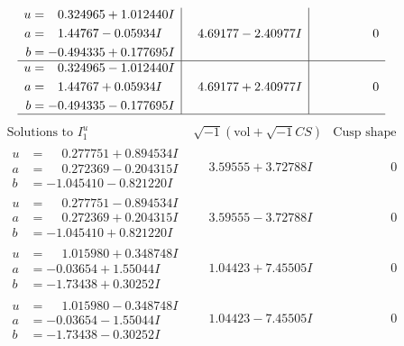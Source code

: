 \documentclass[1p]{elsarticle_modified}
\theoremstyle{definition}
\newcommand{\I}{\sqrt{-1}}
\begin{document}
$$\begin{array}{c|c|c}
\begin{aligned}
u &= \phantom{-}0.324965 + 1.012440 I \\
a &= \phantom{-}1.44767 - 0.05934 I \\
b &= -0.494335 + 0.177695 I\end{aligned}
 & \phantom{-}4.69177 - 2.40977 I & \phantom{-0.000000 } 0 \\ \hline\begin{aligned}
u &= \phantom{-}0.324965 - 1.012440 I \\
a &= \phantom{-}1.44767 + 0.05934 I \\
b &= -0.494335 - 0.177695 I\end{aligned}
 & \phantom{-}4.69177 + 2.40977 I & \phantom{-0.000000 } 0\\
 \hline 
 \end{array}$$\newpage$$\begin{array}{c|c|c}  
\text{Solutions to }I^u_{1}& \I (\text{vol} + \sqrt{-1}CS) & \text{Cusp shape}\\
 \hline 
\begin{aligned}
u &= \phantom{-}0.277751 + 0.894534 I \\
a &= \phantom{-}0.272369 - 0.204315 I \\
b &= -1.045410 - 0.821220 I\end{aligned}
 & \phantom{-}3.59555 + 3.72788 I & \phantom{-0.000000 } 0 \\ \hline\begin{aligned}
u &= \phantom{-}0.277751 - 0.894534 I \\
a &= \phantom{-}0.272369 + 0.204315 I \\
b &= -1.045410 + 0.821220 I\end{aligned}
 & \phantom{-}3.59555 - 3.72788 I & \phantom{-0.000000 } 0 \\ \hline\begin{aligned}
u &= \phantom{-}1.015980 + 0.348748 I \\
a &= -0.03654 + 1.55044 I \\
b &= -1.73438 + 0.30252 I\end{aligned}
 & \phantom{-}1.04423 + 7.45505 I & \phantom{-0.000000 } 0 \\ \hline\begin{aligned}
u &= \phantom{-}1.015980 - 0.348748 I \\
a &= -0.03654 - 1.55044 I \\
b &= -1.73438 - 0.30252 I\end{aligned}
 & \phantom{-}1.04423 - 7.45505 I & \phantom{-0.000000 } 0 \\ \hline\begin{aligned}

\end{aligned}
\end{array}$$
\end{document}
